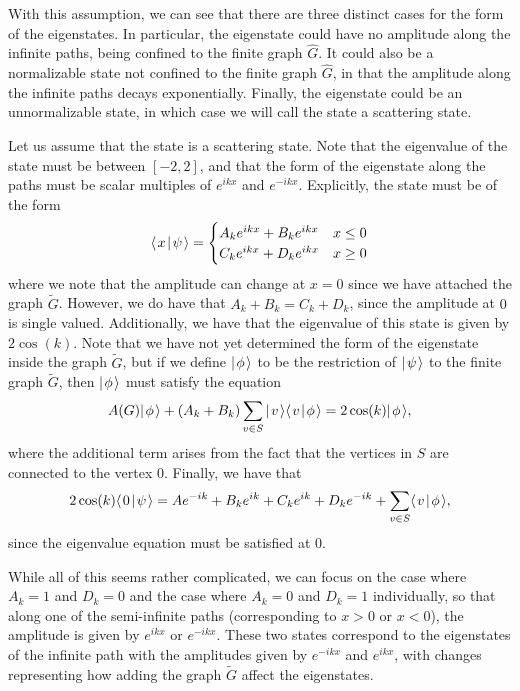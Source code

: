 \documentclass[../thesis-main/thesis-main]{subfiles}
\begin{document}
With this assumption, we can see that there are three distinct cases for the form of the eigenstates.  In particular, the eigenstate could have no amplitude along the infinite paths, being confined to the finite graph $\widehat{G}$.  It could also be a normalizable state not confined to the finite graph $\widehat{G}$, in that the amplitude along the infinite paths decays exponentially.  Finally, the eigenstate could be an unnormalizable state, in which case we will call the state a scattering state.

Let us assume that the state is a scattering state.  Note that the eigenvalue of the state must be between $[-2,2]$, and that the form of the eigenstate along the paths must be scalar multiples of $e^{ikx}$ and $e^{-ikx}$.  Explicitly, the state must be of the form
\begin{align}
  \langle\mspace{2mu} x \mspace{2mu} | \mspace{2mu} \psi\mspace{2mu} \rangle = \begin{cases} A_k e^{i k x} + B_k e^{i k x} & x \leq 0\\
   C_k e^{i k x} + D_k e^{i k x} & x\geq 0\end{cases}
\end{align}
where we note that the amplitude can change at $x=0$ since we have attached the graph $\widetilde{G}$.  However, we do have that $A_k + B_k=C_k +D_k$, since the amplitude at $0$ is single valued.  Additionally, we have that the eigenvalue of this state is given by $2\cos(k)$.  Note that we have not yet determined the form of the eigenstate inside the graph $\widetilde{G}$, but if we define $|\mspace{2mu} \phi \mspace{2mu} \rangle$ to be the restriction of $|\mspace{2mu} \psi \mspace{2mu} \rangle$ to the finite graph $\widetilde{G}$, then $|\mspace{2mu} \phi \mspace{2mu} \rangle$ must satisfy the equation
\begin{equation}
  A(G) |\mspace{2mu} \phi \mspace{2mu} \rangle + (A_k + B_k)\sum_{v\in S} |\mspace{2mu} v \mspace{2mu} \rangle\langle\mspace{2mu} v \mspace{2mu} | \mspace{2mu} \phi\mspace{2mu} \rangle = 2\cos(k) |\mspace{2mu} \phi \mspace{2mu} \rangle,
\end{equation}
where the additional term arises from the fact that the vertices in $S$ are connected to the vertex $0$.  Finally, we have that
\begin{equation}
  2 \cos(k)\langle\mspace{2mu} 0 \mspace{2mu} | \mspace{2mu} \psi\mspace{2mu} \rangle = Ae^{-ik} + B_k e^{ik} + C_k e^{i k} + D_k e^{-ik} + \sum_{v\in S} \langle\mspace{2mu} v \mspace{2mu} | \mspace{2mu} \phi\mspace{2mu} \rangle,
\end{equation}
since the eigenvalue equation must be satisfied at $0$.


While all of this seems rather complicated, we can focus on the case where $A_k = 1$ and $D_k=0$ and the case where $A_k = 0$ and $D_k=1$ individually, so that along one of the semi-infinite paths (corresponding to $x>0$ or $x<0$), the amplitude is given by $e^{ikx}$ or $e^{-ikx}$.  These two states correspond to the eigenstates of the infinite path with the amplitudes given by $e^{-ikx}$ and $e^{ikx}$, with changes representing how adding the graph $\widetilde{G}$ affect the eigenstates.  
\end{document}
